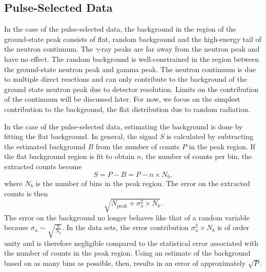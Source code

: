 \subsection{Pulse-Selected Data}
\label{sec:PS_data}
In the case of the pulse-selected data, the background in the region of the ground-state peak consists of flat, random background and the high-energy tail of the neutron continuum.  The $\gamma$-ray peaks are far away from the neutron peak and have no effect.  The random background is well-constrained in the region between the ground-state neutron peak and gamma peak.  The neutron continuum is due to multiple direct reactions and can only contribute to the background of the ground state neutron peak due to detector resolution.  Limits on the contribution of the continuum will be discussed later.  For now, we focus on the simplest contribution to the background, the flat distribution due to random radiation.

In the case of the pulse-selected data, estimating the background is done by fitting the flat background.  In general, the signal $S$ is calculated by subtracting the estimated background $B$ from the number of counts $P$ in the peak region.  If the flat background region is fit to obtain $n$, the number of counts per bin, the extracted counts become
\begin{equation}
S = P - B = P - n\times N_b,
\end{equation}
where $N_b$ is the number of bins in the peak region.  The error on the extracted counts is then
\begin{equation}
\sqrt{N_{\text{peak}} + {\sigma}_n^2\times N_b}.
\end{equation}
The error on the background no longer behaves like that of a random variable because $\sigma_n\sim\sqrt{\frac{n}{N_b}}$.  In the \reaction data sets, the error contribution ${\sigma}_n^2\times N_b$ is of order unity and is therefore negligible compared to the statistical error associated with the number of counts in the peak region.  Using an estimate of the background based on as many bins as possible, then, results in an error of approximately $\sqrt{P}$.

